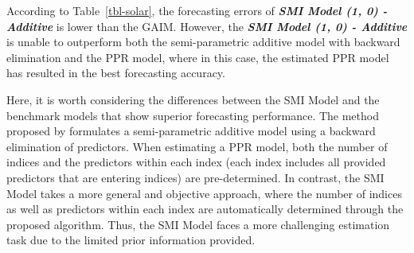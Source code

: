 \documentclass[
  11pt,
  a4paper,
]{article}
\begin{document}
\begin{table}

\caption{\label{tbl-solar}Daily solar intensity forecasting -
Out-of-sample point forecast results.}


\end{table}%

According to Table~\ref{tbl-solar}, the forecasting errors of
\textbf{\emph{SMI Model (1, 0) - Additive}} is lower than the GAIM.
However, the \textbf{\emph{SMI Model (1, 0) - Additive}} is unable to
outperform both the semi-parametric additive model with backward
elimination and the PPR model, where in this case, the estimated PPR
model has resulted in the best forecasting accuracy.

Here, it is worth considering the differences between the SMI Model and
the benchmark models that show superior forecasting performance. The
method proposed by \textcite{FH2012} formulates a semi-parametric
additive model using a backward elimination of predictors. When
estimating a PPR model, both the number of indices and the predictors
within each index (each index includes all provided predictors that are
entering indices) are pre-determined. In contrast, the SMI Model takes a
more general and objective approach, where the number of indices as well
as predictors within each index are automatically determined through the
proposed algorithm. Thus, the SMI Model faces a more challenging
estimation task due to the limited prior information provided.
\end{document}
